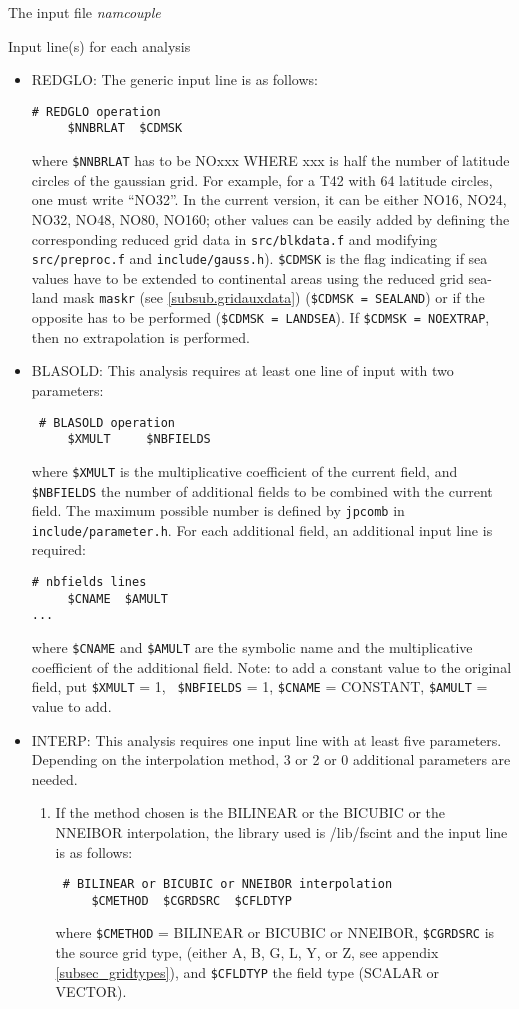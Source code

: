 \begin{subsection}{The input file {\it namcouple}}
\begin{subsubsection}{Input line(s) for each analysis}
\begin{itemize}
\item REDGLO: The generic input line is as follows:
\begin{verbatim}
# REDGLO operation
     $NNBRLAT  $CDMSK
\end{verbatim} 
where {\tt \$NNBRLAT} has to be NOxxx WHERE xxx is half the number of 
latitude circles of the gaussian grid. For example, for a T42 with 64 
latitude circles, one must write ``NO32''. In the current
version, it can be either NO16, NO24, NO32, NO48, NO80, NO160; other
values can be easily added by defining the corresponding reduced grid data in
{\tt src/blkdata.f} and modifying {\tt src/preproc.f} and 
{\tt include/gauss.h}). {\tt \$CDMSK} is the
flag indicating if sea values have to be  extended to continental areas 
using the reduced grid sea-land mask {\tt maskr} (see \ref{subsub.gridauxdata}) ({\tt \$CDMSK = SEALAND}) or if the opposite has
to be performed ({\tt \$CDMSK = LANDSEA}). If {\tt \$CDMSK =
NOEXTRAP}, then no extrapolation is performed.

\item BLASOLD: This analysis requires at least one line of input 
with two parameters:
\begin{verbatim}
 # BLASOLD operation 
     $XMULT     $NBFIELDS
\end{verbatim}
where {\tt \$XMULT} is the multiplicative coefficient of the current field, 
and {\tt \$NBFIELDS}
the number of additional fields to be combined with the current
field. The maximum possible number is defined by {\tt jpcomb} in {\tt
include/parameter.h}.
 For each additional field, an additional input line is required:
\begin{verbatim}
# nbfields lines
     $CNAME  $AMULT
...
\end{verbatim}
where {\tt \$CNAME} and {\tt \$AMULT} are the symbolic name and the 
multiplicative coefficient of the additional field. Note: to add a
constant value to the original field, put {\tt \$XMULT} = 1, {\tt
\$NBFIELDS} = 1, {\tt \$CNAME} = CONSTANT, {\tt \$AMULT} = value to
add.


\item INTERP: This analysis requires one input line with at least five
parameters. Depending on the interpolation method, 3 or 2 or 0 
additional parameters are needed. 

\begin{enumerate}
\item If the method chosen is the BILINEAR or the BICUBIC or the NNEIBOR
interpolation, the library used is /lib/fscint and the input line 
is as follows:
\begin{verbatim}
 # BILINEAR or BICUBIC or NNEIBOR interpolation
     $CMETHOD  $CGRDSRC  $CFLDTYP 
\end{verbatim}
where {\tt \$CMETHOD} = BILINEAR or BICUBIC or NNEIBOR, 
{\tt \$CGRDSRC} is the source grid type,
(either A, B, G, L, Y, or Z, see appendix \ref{subsec_gridtypes}), and {\tt \$CFLDTYP} the field type (SCALAR or VECTOR).
   

\end{enumerate}
\end{itemize}
\end{subsubsection}
\end{subsection}
